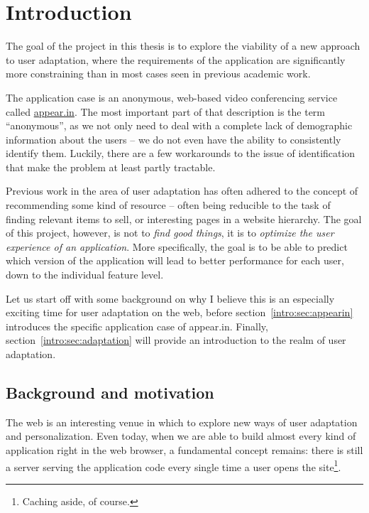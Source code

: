 \chapter{Introduction}

\label{Chapter1}



The goal of the project in this thesis is to explore the viability of a new approach to user adaptation, where the requirements of the application are significantly more constraining than in most cases seen in previous academic work.

The application case is an anonymous, web-based video conferencing service called \url{appear.in}. The most important part of that description is the term ``anonymous'', as we not only need to deal with a complete lack of demographic information about the users -- we do not even have the ability to consistently identify them. Luckily, there are a few workarounds to the issue of identification that make the problem at least partly tractable.

Previous work in the area of user adaptation has often adhered to the concept of recommending some kind of resource -- often being reducible to the task of finding relevant items to sell, or interesting pages in a website hierarchy. The goal of this project, however, is not to \emph{find good things}, it is to \emph{optimize the user experience of an application}. More specifically, the goal is to be able to predict which version of the application will lead to better performance for each user, down to the individual feature level.

Let us start off with some background on why I believe this is an especially exciting time for user adaptation on the web, before section~\ref{intro:sec:appearin} introduces the specific application case of appear.in. Finally, section~\ref{intro:sec:adaptation} will provide an introduction to the realm of user adaptation.

\section{Background and motivation}
\label{sec:motivation}

The web is an interesting venue in which to explore new ways of user adaptation and personalization. Even today, when we are able to build almost every kind of application right in the web browser, a fundamental concept remains: there is still a server serving the application code every single time a user opens the site\footnote{Caching aside, of course.}.

